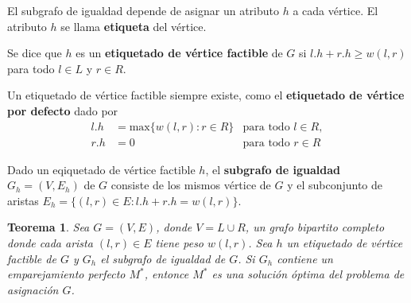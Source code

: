\documentclass[10pt]{article} %
\newtheorem{thm}{Teorema}
\begin{document}
	El subgrafo de igualdad depende de asignar un atributo $h$ a cada v\'ertice. El atributo $h$ se llama \textbf{etiqueta} del v\'ertice. 
	
	Se dice que $h$ es un \textbf{etiquetado de vértice factible} de $G$ si $l.h + r.h \geq w(l,r)$ para todo $l \in L$ y $r \in R$.
	
	Un etiquetado de v\'ertice factible siempre existe, como el \textbf{etiquetado de v\'ertice por defecto} dado por
	\begin{align}
		l.h &= \text{max} \{w(l,r):r \in R\} &\text{para todo } l \in R,\\
		r.h &= 0 &\text{para todo } r \in R 
	\end{align}

	Dado un eqiquetado de v\'ertice factible $h$, el \textbf{subgrafo de igualdad} $G_h = (V, E_h)$ de $G$ consiste de los mismos v\'ertice de $G$ y el subconjunto de aristas $E_h = \{(l,r) \in E: l.h + r.h = w(l,r)\}$.
	
	\begin{thm}
		
		Sea $G=(V,E)$, donde $V = L \cup R$, un grafo bipartito completo donde cada arista $(l,r) \in E$ tiene peso $w(l,r)$. Sea $h$ un etiquetado de v\'ertice factible de $G$ y $G_h$ el subgrafo de igualdad de $G$. Si $G_h$ contiene un emparejamiento perfecto $M^*$, entonce $M^*$ es una soluci\'on \'optima del problema de asignaci\'on $G$.
		
	\end{thm}
\end{document}
